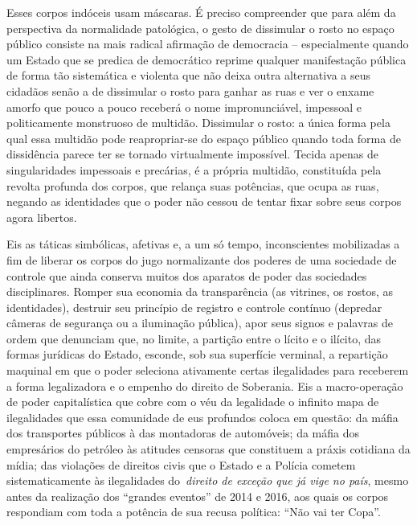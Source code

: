 Esses corpos indóceis usam máscaras. É preciso compreender que para além
da perspectiva da normalidade patológica, o gesto de dissimular o rosto
no espaço público consiste na mais radical afirmação de democracia --
especialmente quando um Estado que se predica de democrático reprime
qualquer manifestação pública de forma tão sistemática e violenta que
não deixa outra alternativa a seus cidadãos senão a de dissimular o
rosto para ganhar as ruas e ver o enxame amorfo que pouco a pouco
receberá o nome impronunciável, impessoal e politicamente monstruoso de
multidão. Dissimular o rosto: a única forma pela qual essa multidão pode
reapropriar-se do espaço público quando toda forma de dissidência parece
ter se tornado virtualmente impossível. Tecida apenas de singularidades
impessoais e precárias, é a própria multidão, constituída pela revolta
profunda dos corpos, que relança suas potências, que ocupa as ruas,
negando as identidades que o poder não cessou de tentar fixar sobre seus
corpos agora libertos.

Eis as táticas simbólicas, afetivas e, a um só tempo, inconscientes
mobilizadas a fim de liberar os corpos do jugo normalizante dos poderes
de uma sociedade de controle que ainda conserva muitos dos aparatos de
poder das sociedades disciplinares. Romper sua economia da transparência
(as vitrines, os rostos, as identidades), destruir seu princípio de
registro e controle contínuo (depredar câmeras de segurança ou a
iluminação pública), apor seus signos e palavras de ordem que denunciam
que, no limite, a partição entre o lícito e o ilícito, das formas
jurídicas do Estado, esconde, sob sua superfície verminal, a repartição
maquinal em que o poder seleciona ativamente certas ilegalidades para
receberem a forma legalizadora e o empenho do direito de Soberania. Eis
a macro-operação de poder capitalística que cobre com o véu da
legalidade o infinito mapa de ilegalidades que essa comunidade de eus
profundos coloca em questão: da máfia dos transportes públicos à das
montadoras de automóveis; da máfia dos empresários do petróleo às
atitudes censoras que constituem a práxis cotidiana da mídia; das
violações de direitos civis que o Estado e a Polícia cometem
sistematicamente às ilegalidades do~\emph{\emph{direito de exceção que
já vige no país}}, mesmo antes da realização dos ``grandes eventos'' de
2014 e 2016, aos quais os corpos respondiam com toda a potência de sua
recusa política: ``Não vai ter Copa''.

